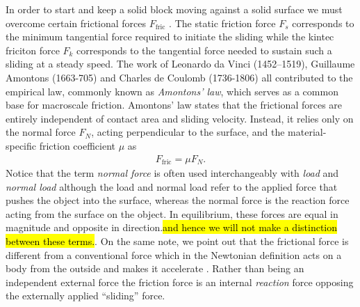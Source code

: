  In order to start and keep a solid block moving against a solid surface we must
 overcome certain frictional forces $F_{\text{fric}}$ \cite{gnecco_meyer_2015}.
 The static friction force $F_s$ corresponds to the minimum tangential force
 required to initiate the sliding while the kintec friciton force $F_k$
 corresponds to the tangential force needed to sustain such a sliding at a steady
 speed. The work of Leonardo da Vinci (1452–1519), Guillaume Amontons (1663-705)
 and Charles de Coulomb (1736-1806) all contributed to the empirical law,
 commonly known as \textit{Amontons’ law}, which serves as a common base for macroscale
 friction. Amontons’ law states that the frictional forces are entirely
 independent of contact area and sliding velocity. Instead, it relies only on
 the normal force $F_N$, acting perpendicular to the surface, and the material-specific friction coefficient $\mu$ as
\begin{align}
  F_{\text{fric}} = \mu F_N.
  \label{eq:amonton}
\end{align}
Notice that the term \textit{normal force} is often used interchangeably with \textit{load} and \textit{normal load} although the load and normal load refer to the applied force that pushes the object into the surface, whereas the normal force is the reaction force acting from the surface on the object. In equilibrium, these forces are equal in magnitude and opposite in direction.\hl{and hence we will not make a distinction between these terms.}. On the same note, we point out that the frictional force is different from a conventional force which in the Newtonian definition acts on a body from the outside and makes it accelerate \cite{gao_frictional_2004}. Rather than being an independent external force the friction force is an internal \textit{reaction} force opposing the externally applied ``sliding'' force. 

